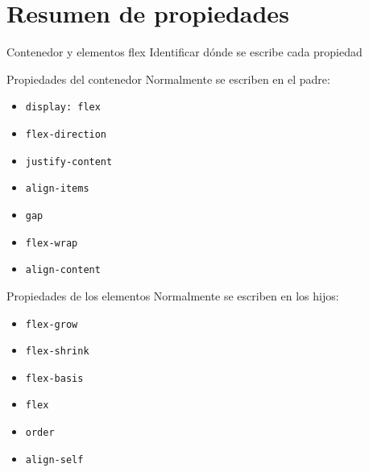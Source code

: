 \documentclass[aspectratio=169,11.5pt]{beamer}
\begin{document}

    \section{Resumen de propiedades}

    \SectionSlide
    {Contenedor y elementos flex}
    {Identificar dónde se escribe cada propiedad}

    \begin{frame}{Propiedades del contenedor}
        Normalmente se escriben en el padre:

        \begin{itemize}
            \item \texttt{display: flex}
            \item \texttt{flex-direction}
            \item \texttt{justify-content}
            \item \texttt{align-items}
            \item \texttt{gap}
            \item \texttt{flex-wrap}
            \item \texttt{align-content}
        \end{itemize}
    \end{frame}

    \begin{frame}{Propiedades de los elementos}
        Normalmente se escriben en los hijos:

        \begin{itemize}
            \item \texttt{flex-grow}
            \item \texttt{flex-shrink}
            \item \texttt{flex-basis}
            \item \texttt{flex}
            \item \texttt{order}
            \item \texttt{align-self}
        \end{itemize}
    \end{frame}
\end{document}
